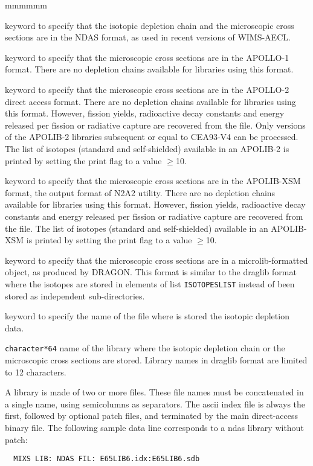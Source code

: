 \begin{ListeDeDescription}{mmmmmm}
\item[\moc{NDAS}] keyword to specify that the isotopic depletion chain and the
microscopic cross sections are in the NDAS format, as used in recent versions of WIMS-AECL.

\item[\moc{APLIB1}] keyword to specify that the microscopic cross sections are
in the APOLLO-1 format. There are no depletion chains available for libraries using this
format.

\item[\moc{APLIB2}] keyword to specify that the microscopic cross sections are
in the APOLLO-2 direct access format. There are no depletion chains available for libraries
using this format. However, fission yields, radioactive decay constants and
energy released per fission or radiative capture are recovered from the file.
Only versions of the APOLIB-2 libraries subsequent or equal to CEA93-V4 can be
processed. The list of isotopes (standard and self-shielded) available in an APOLIB-2
is printed by setting the print flag to a value $\ge$10.

\item[\moc{APXSM}] keyword to specify that the microscopic cross sections are
in the APOLIB-XSM format, the output format of N2A2 utility. There are no depletion chains available for libraries
using this format. However, fission yields, radioactive decay constants and
energy released per fission or radiative capture are recovered from the file.
The list of isotopes (standard and self-shielded) available in an APOLIB-XSM
is printed by setting the print flag to a value $\ge$10.

\item[\moc{MICROLIB}] keyword to specify that the microscopic cross sections are
in a {\sc microlib}-formatted object, as produced by DRAGON. This format is similar to the {\sc draglib}
format where the isotopes are stored in elements of list {\tt ISOTOPESLIST} instead of been stored
as independent sub-directories.

\item[\moc{FIL:}] keyword to specify the name of the file where is stored the
isotopic depletion data. 

\item[\dusa{NAMEFIL}] {\tt character*64} name of the library
where the isotopic depletion chain or the microscopic cross sections are stored. Library names in {\sc draglib}
format are limited to 12 characters.

A  library is made of two or more files. These file names must be concatenated in a single
 name, using semicolumns as separators. The {\sc ascii} index file is always the first,
followed by optional patch files, and terminated by the main direct-access binary file. The
following sample data line corresponds to a {\sc ndas} library without patch:
\begin{verbatim}
  MIXS LIB: NDAS FIL: E65LIB6.idx:E65LIB6.sdb
\end{verbatim}


\end{ListeDeDescription}
